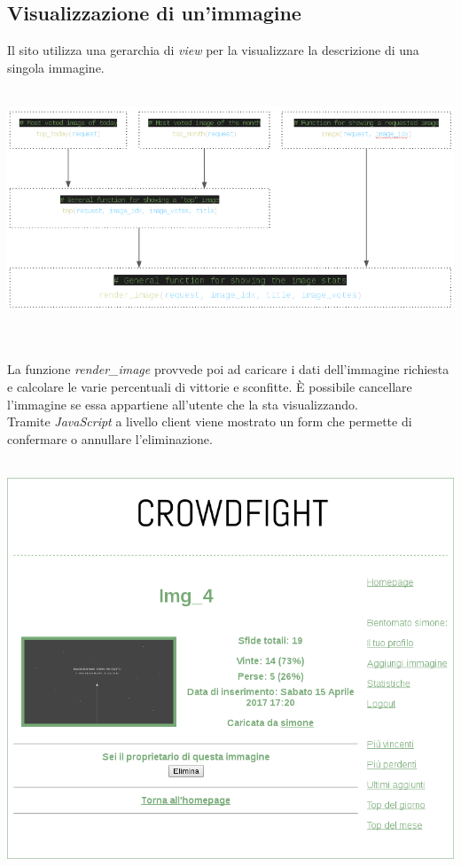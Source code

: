 \documentclass{scrreprt}
\begin{document}
\subsection{Visualizzazione di un'immagine}
Il sito utilizza una gerarchia di \textit{view} per la visualizzare la descrizione di una singola immagine.
\\\\
\centerline{\includegraphics[scale=0.46]{schemeimg}}
\\\\La funzione \textit{render_image} provvede poi ad caricare i dati dell'immagine richiesta e calcolare le varie percentuali di vittorie e sconfitte. È possibile cancellare l'immagine se essa appartiene all'utente che la sta visualizzando.\\
Tramite \textit{JavaScript} a livello client viene mostrato un form che permette di confermare o annullare l'eliminazione.
\\\\
\centerline{\includegraphics[scale=0.46]{single}}
\pagebreak
\end{document}

